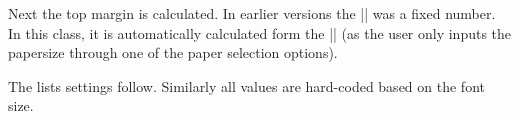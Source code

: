 \begin{multicols}{2}
 Next the top margin is calculated.  In earlier versions the |\topmargin| was a fixed number. In this class, it is automatically calculated form the |\paperheight| (as the user only inputs the papersize through one of the paper selection options).
\end{multicols}

\begin{teX}
\if@compatibility
  \setlength\topmargin{.75in}
\else
  \setlength\topmargin{\paperheight}
  \addtolength\topmargin{-2in}
  \addtolength\topmargin{-\headheight}
  \addtolength\topmargin{-\headsep}
  \addtolength\topmargin{-\textheight}
  \addtolength\topmargin{-\footskip}     %
  \addtolength\topmargin{-.5\topmargin}
  \@settopoint\topmargin
\fi
\end{teX}

The lists settings follow. Similarly all values are hard-coded based on the font size.











